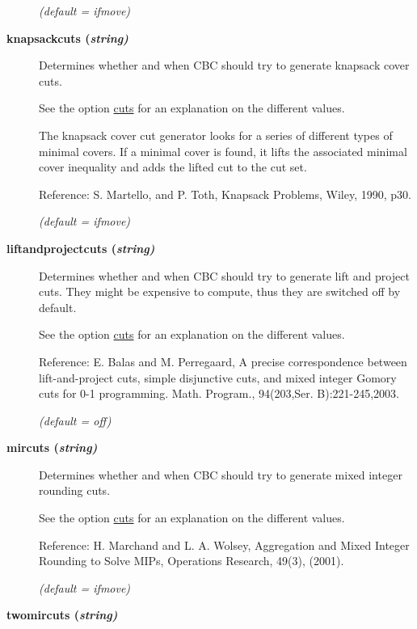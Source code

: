 \begin{description}
\textsl{(default = ifmove)}

\item[\label{knapsackcuts}\hypertarget{knapsackcuts}
{\textbf{knapsackcuts (\slshape{string})}}]\hspace{1.0in}

Determines whether and when CBC should try to generate knapsack cover cuts.

See the option \hyperlink{cuts}{cuts} for an explanation on the different values.

The knapsack cover cut generator looks for a series of different types of minimal covers.
If a minimal cover is found, it lifts the associated minimal cover inequality and adds the lifted cut to the cut set.

Reference: S. Martello, and P. Toth, Knapsack Problems, Wiley, 1990, p30.

\textsl{(default = ifmove)}

\item[\label{liftandprojectcuts}\hypertarget{liftandprojectcuts}
{\textbf{liftandprojectcuts (\slshape{string})}}]\hspace{1.0in}

Determines whether and when CBC should try to generate lift and project cuts.
They might be expensive to compute, thus they are switched off by default.

See the option \hyperlink{cuts}{cuts} for an explanation on the different values.

Reference: E. Balas and M. Perregaard, A precise correspondence between lift-and-project cuts, simple disjunctive cuts, and mixed integer Gomory cuts for 0-1 programming. Math. Program., 94(203,Ser. B):221-245,2003.

\textsl{(default = off)}

\item[\label{mircuts}\hypertarget{mircuts}
{\textbf{mircuts (\slshape{string})}}]\hspace{1.0in}

Determines whether and when CBC should try to generate mixed integer rounding cuts.

See the option \hyperlink{cuts}{cuts} for an explanation on the different values.

Reference: H. Marchand and L. A. Wolsey, Aggregation and Mixed Integer Rounding to Solve MIPs, Operations Research, 49(3), (2001).

\textsl{(default = ifmove)}

\item[\label{twomircuts}\hypertarget{twomircuts}
{\textbf{twomircuts (\slshape{string})}}]\hspace{1.0in}


\end{description}
